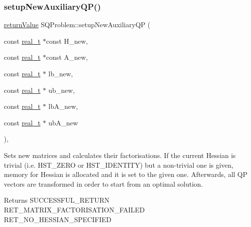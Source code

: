 \subsubsection{\texorpdfstring{setup\+New\+Auxiliary\+Q\+P()}{setupNewAuxiliaryQP()}\hspace{0.1cm}{\footnotesize\ttfamily [2/2]}}
{\footnotesize\ttfamily \hyperlink{_message_handling_8hpp_a81d556f613bfbabd0b1f9488c0fa865e}{return\+Value} S\+Q\+Problem\+::setup\+New\+Auxiliary\+QP (\begin{DoxyParamCaption}\item[{const \hyperlink{qp_o_a_s_e_s__wrapper_8h_a0d00e2b3dfadee81331bbb39068570c4}{real\+\_\+t} $\ast$const}]{H\+\_\+new,  }\item[{const \hyperlink{qp_o_a_s_e_s__wrapper_8h_a0d00e2b3dfadee81331bbb39068570c4}{real\+\_\+t} $\ast$const}]{A\+\_\+new,  }\item[{const \hyperlink{qp_o_a_s_e_s__wrapper_8h_a0d00e2b3dfadee81331bbb39068570c4}{real\+\_\+t} $\ast$}]{lb\+\_\+new,  }\item[{const \hyperlink{qp_o_a_s_e_s__wrapper_8h_a0d00e2b3dfadee81331bbb39068570c4}{real\+\_\+t} $\ast$}]{ub\+\_\+new,  }\item[{const \hyperlink{qp_o_a_s_e_s__wrapper_8h_a0d00e2b3dfadee81331bbb39068570c4}{real\+\_\+t} $\ast$}]{lb\+A\+\_\+new,  }\item[{const \hyperlink{qp_o_a_s_e_s__wrapper_8h_a0d00e2b3dfadee81331bbb39068570c4}{real\+\_\+t} $\ast$}]{ub\+A\+\_\+new }\end{DoxyParamCaption})\hspace{0.3cm}{\ttfamily [protected]}, {\ttfamily [virtual]}}

Sets new matrices and calculates their factorisations. If the current Hessian is trivial (i.\+e. H\+S\+T\+\_\+\+Z\+E\+RO or H\+S\+T\+\_\+\+I\+D\+E\+N\+T\+I\+TY) but a non-\/trivial one is given, memory for Hessian is allocated and it is set to the given one. Afterwards, all QP vectors are transformed in order to start from an optimal solution. \begin{DoxyReturn}{Returns}
S\+U\+C\+C\+E\+S\+S\+F\+U\+L\+\_\+\+R\+E\+T\+U\+RN ~\newline
 R\+E\+T\+\_\+\+M\+A\+T\+R\+I\+X\+\_\+\+F\+A\+C\+T\+O\+R\+I\+S\+A\+T\+I\+O\+N\+\_\+\+F\+A\+I\+L\+ED ~\newline
 R\+E\+T\+\_\+\+N\+O\+\_\+\+H\+E\+S\+S\+I\+A\+N\+\_\+\+S\+P\+E\+C\+I\+F\+I\+ED 
\end{DoxyReturn}

